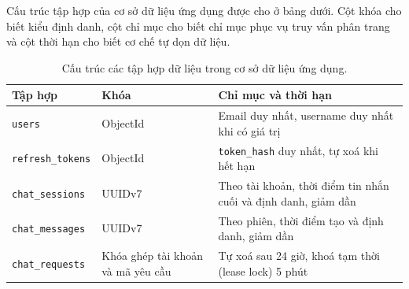 Cấu trúc tập hợp của cơ sở dữ liệu ứng dụng được cho ở bảng dưới. Cột khóa cho biết kiểu định danh, cột chỉ mục cho biết chỉ mục phục vụ truy vấn phân trang và cột thời hạn cho biết cơ chế tự dọn dữ liệu.

\begin{table}[htbp]
    \centering
    \caption{Cấu trúc các tập hợp dữ liệu trong cơ sở dữ liệu ứng dụng.}
    \label{tab:cau-truc-tap-hop}
    \small
    \begin{tabularx}{\textwidth}{@{}l>{\raggedright\arraybackslash}p{4.2cm}>{\raggedright\arraybackslash}X@{}}
        \toprule
        \textbf{Tập hợp} & \textbf{Khóa} & \textbf{Chỉ mục và thời hạn} \\
        \midrule
        \texttt{users} & ObjectId & Email duy nhất, username duy nhất khi có giá trị \\
        \texttt{refresh\_tokens} & ObjectId & \texttt{token\_hash} duy nhất, tự xoá khi hết hạn \\
        \texttt{chat\_sessions} & UUIDv7 & Theo tài khoản, thời điểm tin nhắn cuối và định danh, giảm dần \\
        \texttt{chat\_messages} & UUIDv7 & Theo phiên, thời điểm tạo và định danh, giảm dần \\
        \texttt{chat\_requests} & Khóa ghép tài khoản và mã yêu cầu & Tự xoá sau 24 giờ, khoá tạm thời (lease lock) 5 phút \\
        \bottomrule
    \end{tabularx}
\end{table}

